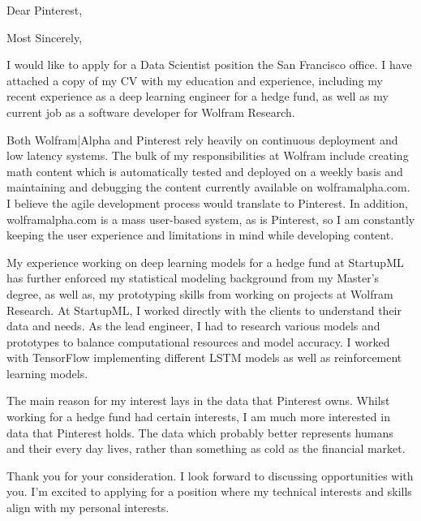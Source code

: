 \documentclass[11pt,a4paper,unicode]{moderncv}
\begin{document}
\vspace*{-6mm}

\vspace*{-6mm}



\date{\today} %


\opening{{Dear Pinterest},} %
\closing{Most Sincerely,} %

\makelettertitle %
	I would like to apply for a Data Scientist position the San Francisco office. I have attached a copy of my CV with my education and experience, including my recent experience as a deep learning engineer for a hedge fund, as well as my current job as a software developer for Wolfram Research. 
			
\vspace{3mm}  
	Both Wolfram|Alpha and Pinterest rely heavily on continuous deployment and low latency systems. The bulk of my responsibilities at Wolfram include creating math content which is automatically tested and deployed on a weekly basis and maintaining and debugging the content currently available on wolframalpha.com. I believe the agile development process would translate to Pinterest. In addition, wolframalpha.com is a mass user-based system, as is Pinterest, so I am constantly keeping the user experience and limitations in mind while developing content. 
	
\vspace{3mm}  
	My experience working on deep learning models for a hedge fund at StartupML has further enforced my statistical modeling background from my Master's degree, as well as, my prototyping skills from working on projects at Wolfram Research. At StartupML, I worked directly with the clients to understand their data and needs. As the lead engineer, I had to research various models and prototypes to balance computational resources and model accuracy. I worked with TensorFlow implementing different LSTM models as well as reinforcement learning models. 
	

\vspace{3mm}	
	The main reason for my interest lays in the data that Pinterest owns. Whilst working for a hedge fund had certain interests, I am much more interested in data that Pinterest holds. The data which probably better represents humans and their every day lives, rather than something as cold as the financial market.
	
\vspace{3mm}  
	Thank you for your consideration. I look forward to discussing opportunities with you. I'm excited to applying for a position where my technical interests and skills align with my personal interests. 

\makeletterclosing %
\end{document}
